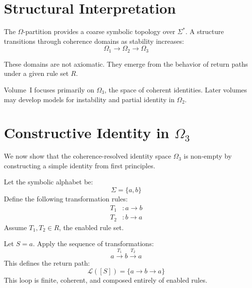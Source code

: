 \section{Structural Interpretation} \label{structural-interpretation}

The $\Omega$-partition provides a coarse symbolic topology over $\Sigma^*$.  
A structure transitions through coherence domains as stability increases:
\begin{equation} \label{eq:omega-transition}
\Omega_1 \rightarrow \Omega_2 \rightarrow \Omega_3
\end{equation}

These domains are not axiomatic.  
They emerge from the behavior of return paths under a given rule set $R$.

Volume~I focuses primarily on $\Omega_3$, the space of coherent identities.  
Later volumes may develop models for instability and partial identity in $\Omega_2$.

\section{Constructive Identity in $\Omega_3$}

We now show that the coherence-resolved identity space $\Omega_3$ is non-empty by constructing a simple identity from first principles.

\begin{definition} \label{def:minimal-rule-system}
Let the symbolic alphabet be:
\[
\Sigma = \{a, b\}
\]
Define the following transformation rules:
\begin{align}
T_1 &: a \rightarrow b \label{eq:rule-t1} \\
T_2 &: b \rightarrow a \label{eq:rule-t2}
\end{align}
Assume $T_1, T_2 \in R$, the enabled rule set.
\end{definition}

\begin{definition} \label{def:constructed-identity}
Let $S = a$. Apply the sequence of transformations:
\[
a \xrightarrow{T_1} b \xrightarrow{T_2} a
\]
This defines the return path:
\begin{equation} \label{eq:return-loop-identity}
\mathcal{L}([S]) = \{ a \rightarrow b \rightarrow a \}
\end{equation}
This loop is finite, coherent, and composed entirely of enabled rules.
\end{definition}

